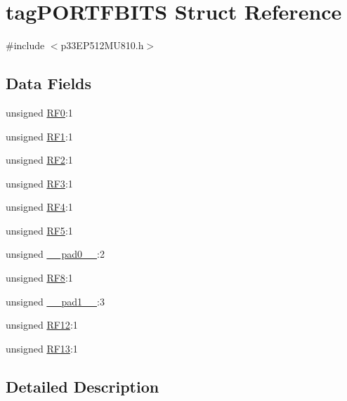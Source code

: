 \hypertarget{structtag_p_o_r_t_f_b_i_t_s}{}\section{tag\+P\+O\+R\+T\+F\+B\+I\+TS Struct Reference}
\label{structtag_p_o_r_t_f_b_i_t_s}


{\ttfamily \#include $<$p33\+E\+P512\+M\+U810.\+h$>$}

\subsection*{Data Fields}
\begin{DoxyCompactItemize}
\item 
unsigned \hyperlink{structtag_p_o_r_t_f_b_i_t_s_ac9520a6967ea24e35f5e1519f869b754}{R\+F0}\+:1
\item 
unsigned \hyperlink{structtag_p_o_r_t_f_b_i_t_s_a95b53d928af372353de3e9452f5a9cd1}{R\+F1}\+:1
\item 
unsigned \hyperlink{structtag_p_o_r_t_f_b_i_t_s_a9dde285f376787cb7cad0f2d0023f99d}{R\+F2}\+:1
\item 
unsigned \hyperlink{structtag_p_o_r_t_f_b_i_t_s_a7da124a4d5b23a037a4e72413cab3b34}{R\+F3}\+:1
\item 
unsigned \hyperlink{structtag_p_o_r_t_f_b_i_t_s_a5e0dfdd6cbb179ae8d93186677fb14a6}{R\+F4}\+:1
\item 
unsigned \hyperlink{structtag_p_o_r_t_f_b_i_t_s_a0505c3aec08bb91fcc7dcb7fbb286ef3}{R\+F5}\+:1
\item 
unsigned \hyperlink{structtag_p_o_r_t_f_b_i_t_s_adf71f3d8410c1f1dbbc96680a92c49af}{\+\_\+\+\_\+pad0\+\_\+\+\_\+}\+:2
\item 
unsigned \hyperlink{structtag_p_o_r_t_f_b_i_t_s_ad218b2653cd2cff74cc8524ffbb048d6}{R\+F8}\+:1
\item 
unsigned \hyperlink{structtag_p_o_r_t_f_b_i_t_s_acaf2d0924a107ec6e8d2e31febaf66f9}{\+\_\+\+\_\+pad1\+\_\+\+\_\+}\+:3
\item 
unsigned \hyperlink{structtag_p_o_r_t_f_b_i_t_s_a3d39fd41e2202f44e752850a69067d29}{R\+F12}\+:1
\item 
unsigned \hyperlink{structtag_p_o_r_t_f_b_i_t_s_a5179e1656d1f34cdf7c56ea83c787a85}{R\+F13}\+:1
\end{DoxyCompactItemize}


\subsection{Detailed Description}


